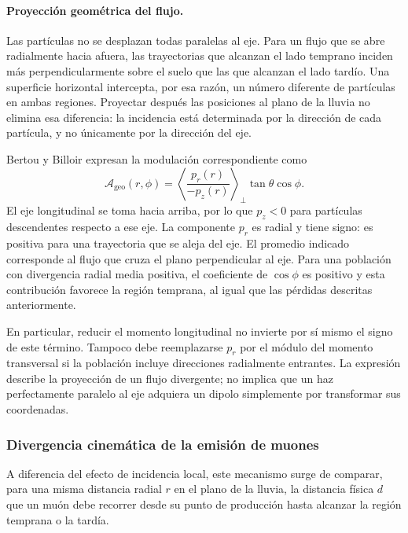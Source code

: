 \paragraph{Proyección geométrica del flujo.}

Las partículas no se desplazan todas paralelas al eje. Para un flujo que se abre radialmente hacia afuera, las trayectorias que alcanzan el lado temprano inciden más perpendicularmente sobre el suelo que las que alcanzan el lado tardío. Una superficie horizontal intercepta, por esa razón, un número diferente de partículas en ambas regiones. Proyectar después las posiciones al plano de la lluvia no elimina esa diferencia: la incidencia está determinada por la dirección de cada partícula, y no únicamente por la dirección del eje.

Bertou y Billoir expresan la modulación correspondiente como~\cite[Sec.~4, Ec.~(4)]{GAP2000_017}
\begin{equation}
\mathcal A_{\mathrm{geo}}(r,\phi)=
\left\langle\frac{p_r(r)}{-p_z(r)}\right\rangle_{\!\perp}
\tan\theta\cos\phi.
\label{eq:efecto_geo}
\end{equation}
El eje longitudinal se toma hacia arriba, por lo que $p_z<0$ para partículas descendentes respecto a ese eje. La componente $p_r$ es radial y tiene signo: es positiva para una trayectoria que se aleja del eje. El promedio indicado corresponde al flujo que cruza el plano perpendicular al eje. Para una población con divergencia radial media positiva, el coeficiente de $\cos\phi$ es positivo y esta contribución favorece la región temprana, al igual que las pérdidas descritas anteriormente.

En particular, reducir el momento longitudinal no invierte por sí mismo el signo de este término. Tampoco debe reemplazarse $p_r$ por el módulo del momento transversal si la población incluye direcciones radialmente entrantes. La expresión describe la proyección de un flujo divergente; no implica que un haz perfectamente paralelo al eje adquiera un dipolo simplemente por transformar sus coordenadas.

\subsubsection{Divergencia cinemática de la emisión de muones}
\label{subsubsec:divergencia_cinematica}

A diferencia del efecto de incidencia local, este mecanismo surge de comparar, para una misma distancia radial $r$ en el plano de la lluvia, la distancia física $d$ que un muón debe recorrer desde su punto de producción hasta alcanzar la región temprana o la tardía.

